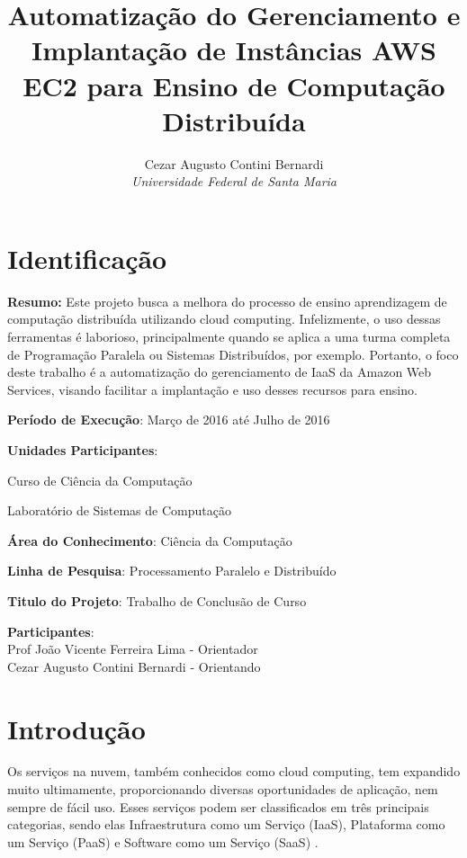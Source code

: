 \documentclass[12pt]{article}
\title{Automatização do Gerenciamento e Implantação de Instâncias AWS EC2 para Ensino de Computação Distribuída}
\author{Cezar Augusto Contini Bernardi \\ \emph{Universidade Federal de Santa Maria}}
\begin{document}
\maketitle


\section{Identificação}

\begin{description} \itemsep 0pt

\item{\textbf{Resumo:}} Este projeto busca a melhora do processo de ensino aprendizagem de computação distribuída utilizando cloud computing. Infelizmente, o uso dessas ferramentas é laborioso, principalmente quando se aplica a uma turma completa de Programação Paralela ou Sistemas Distribuídos, por exemplo. Portanto, o foco deste trabalho é a automatização do gerenciamento de IaaS da Amazon Web Services, visando facilitar a implantação e uso desses recursos para ensino.


\item{\textbf{Período de Execução}}: Março de 2016 até Julho de 2016

\item{\textbf{Unidades Participantes}}: 

    Curso de Ciência da Computação
    
    Laboratório de Sistemas de Computação
    
\item{\textbf{Área do Conhecimento}}: Ciência da Computação

\item{\textbf{Linha de Pesquisa}}:  Processamento Paralelo e Distribuído

\item{\textbf{Titulo do Projeto}}: Trabalho de Conclusão de Curso

\item{\textbf{Participantes}}:
\\Prof João Vicente Ferreira Lima - Orientador
\\Cezar Augusto Contini Bernardi - Orientando 
\end{description}


\section{Introdução}

Os serviços na nuvem, também conhecidos como cloud computing, tem expandido muito ultimamente, proporcionando diversas oportunidades de aplicação, nem sempre de fácil uso. Esses serviços podem ser classificados em três principais categorias, sendo elas Infraestrutura como um Serviço (IaaS), Plataforma como um Serviço (PaaS) e Software como um Serviço (SaaS) \cite{xaas}.
\end{document}
